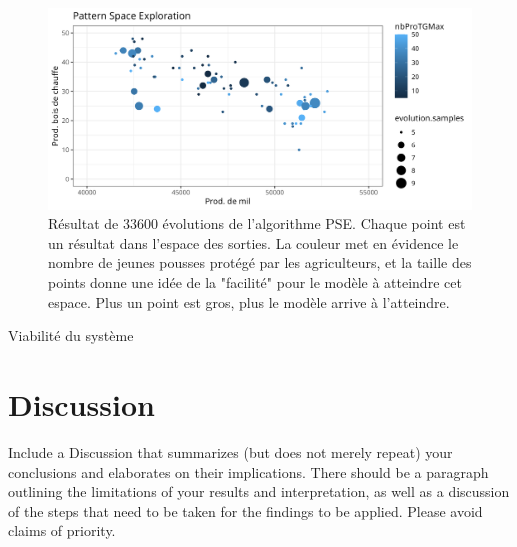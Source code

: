 \documentclass{article}
\begin{document}
        \begin{figure}[h]
            \centering
            \includegraphics[width=\textwidth]{./img/om_pse.png}
            \caption{Résultat de 33600 évolutions de l'algorithme PSE. Chaque point est un résultat dans l'espace des sorties. La couleur met en évidence le nombre de jeunes pousses protégé par les agriculteurs, et la taille des points donne une idée de la "facilité" pour le modèle à atteindre cet espace. Plus un point est gros, plus le modèle arrive à l'atteindre.}
            \label{fig:PSE}
        \end{figure}

Viabilité du système 


\section{Discussion}
Include a Discussion that summarizes (but does not merely repeat) your conclusions and elaborates on their implications. There should be a paragraph outlining the limitations of your results and interpretation, as well as a discussion of the steps that need to be taken for the findings to be applied. Please avoid claims of priority. 
\end{document}

